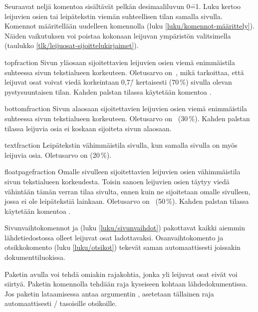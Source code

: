\noindent
Seuraavat neljä komentoa sisältävät pelkän desimaaliluvun 0\==1. Luku
kertoo leijuvien osien tai leipätekstin viemän suhteellisen tilan
samalla sivulla. Komennot määritellään uudelleen komennolla
 (luku \ref{luku/komennot-määrittely}). Näiden
vaikutuksen voi poistaa kokonaan leijuvan ympäristön valitsimella
\koodi{!} (taulukko \ref{tlk/leijuosat-sijoittelukirjaimet}).

\begin{maaritelma}{}
\item [topfraction] Sivun yläosaan sijoitettavien leijuvien osien viemä
  enimmäistila suhteessa sivun tekstialueen korkeuteen. Oletusarvo
  on~, mikä tarkoittaa, että leijuvat osat voivat viedä
  korkeintaan 0,7\=/ kertaisesti (70\,\%) sivulla olevan pystysuuntaisen
  tilan. Kahden palstan tilassa käytetään komentoa
  .
\item [bottomfraction] Sivun alaosaan sijoitettavien leijuvien osien
  viemä enimmäistila suhteessa sivun tekstialueen korkeuteen. Oletusarvo
  on~ (30\,\%). Kahden palstan tilassa leijuvia osia ei
  koskaan sijoiteta sivun alaosaan.
\item [textfraction] Leipätekstin vähimmäistila sivulla, kun samalla
  sivulla on myös leijuvia osia. Oletusarvo on  (20\,\%).
\item [floatpagefraction] Omalle sivulleen sijoitettavien leijuvien
  osien vähimmäistila sivun tekstialueen korkeudesta. Toisin sanoen
  leijuvien osien täytyy viedä vähintään tämän verran tilaa sivulta,
  ennen kuin ne sijoitetaan omalle sivulleen, jossa ei ole leipätekstiä
  lainkaan. Oletusarvo on~ (50\,\%). Kahden palstan tilassa
  käytetään komentoa .
\end{maaritelma}

\noindent
Sivunvaihtokomennot  ja 
(luku \ref{luku/sivunvaihdot}) pakottavat kaikki aiemmin
lähdetiedostossa olleet leijuvat osat ladottavaksi. Osanvaihtokomento
 ja otsikkokomento  (luku
\ref{luku/otsikot}) tekevät saman automaattisesti joissakin
dokumenttiluokissa.

Paketin  avulla voi tehdä omiakin rajakohtia,
jonka yli leijuvat osat eivät voi siirtyä. Paketin komennolla
 tehdään raja kyseiseen kohtaan lähdedokumentissa.
Jos paketin lataamisessa antaa argumentin , asetetaan
tällainen raja automaattisesti \-/ tasoisille
otsikoille.

